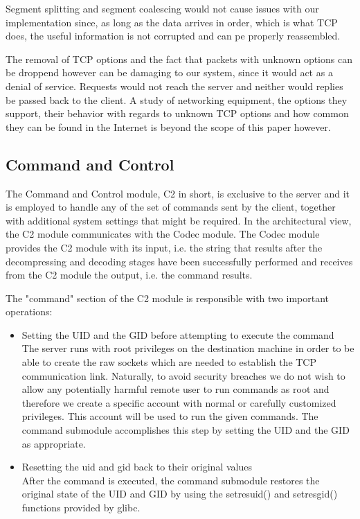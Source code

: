 Segment splitting and segment coalescing would not cause issues with our implementation
since, as long as the data arrives in order, which is what TCP does, the useful
information is not corrupted and can pe properly reassembled.

The removal of TCP options and the fact that packets with unknown options can be
droppend however can be damaging to our system, since it would act as a denial of
service. Requests would not reach the server and neither would replies be passed
back to the client. A study of networking equipment, the options they support, their
behavior with regards to unknown TCP options and how common they can be found in
the Internet is beyond the scope of this paper however.

\subsection{Command and Control}

The Command and Control module, C2 in short, is exclusive to the server and it is
employed to handle any of the set of commands sent by the client, together with additional
system settings that might be required. In the architectural view, the C2 module
communicates with the Codec module. The Codec module provides the C2 module with
its input, i.e. the string that results after the decompressing and decoding stages
have been successfully performed and receives from the C2 module the output, i.e.
the command results.
	
The "command" section of the C2 module is responsible with two important operations:
\begin{itemize}
\item Setting the UID and the GID before attempting to execute the command \\
The server runs with root privileges on the destination machine in order to be
able to create the raw sockets which are needed to establish the TCP communication
link. Naturally, to avoid security breaches we do not wish to allow any potentially
harmful remote user to run commands as root and therefore we create a specific
account with normal or carefully customized privileges. This account will be used
to run the given commands. The command submodule accomplishes this step by setting
the UID and the GID as appropriate.
\item Resetting the uid and gid back to their original values \\
After the command is executed, the command submodule restores the original state
of the UID and GID by using the setresuid() and setresgid() functions provided by glibc.
\end{itemize}

